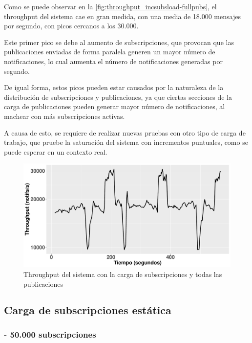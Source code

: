 Como se puede observar en la \autoref{fig:throughput_incsubsload-fullpubs}, el
throughput del sistema cae en gran medida, con una media de 18.000 mensajes 
por segundo, con picos cercanos a los 30.000.

Este primer pico se debe al aumento de subscripciones, que provocan que las 
publicaciones enviadas de forma paralela generen un mayor número de notificaciones,
lo cual aumenta el número de notificaciones generadas por segundo.

De igual forma, estos picos pueden estar causados por la naturaleza de la
distribución de subscripciones y publicaciones, ya que ciertas secciones de la 
carga de publicaciones pueden generar mayor número de notificaciones, al
machear con más subscripciones activas.

A causa de esto, se requiere de realizar nuevas pruebas con otro tipo de
carga de trabajo, que pruebe la saturación del sistema con incrementos puntuales,
como se puede esperar en un contexto real.

\begin{figure}[htpb]
    \centering
    \includegraphics[width=\textwidth]{images/throughput_inc-subs-load-full.pdf}
    \caption{Throughput del sistema con la carga de subscripciones y todas las publicaciones}
    \label{fig:throughput_incsubsload-fullpubs}
\end{figure}



\subsection*{Carga de subscripciones estática}

\subsubsection*{- 50.000 subscripciones}

